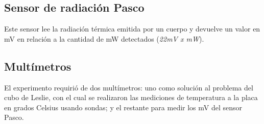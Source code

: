 \documentclass[a4paper]{article}
\begin{document}
        \subsection{Sensor de radiación Pasco}
            \indent Este sensor lee la radiación térmica emitida por un cuerpo y devuelve un valor en mV en relación a la cantidad de mW detectados (\textit{22mV x mW}). \\
            \vspace{6.5cm}

        \subsection{Multímetros}
            \indent El experimento requirió de dos multímetros: uno como solución al problema del cubo de Leslie, con el cual se realizaron las mediciones de temperatura a la placa en grados Celsius usando sondas; y el restante para medir los mV del sensor Pasco.
            \vspace{5cm}
\end{document}
